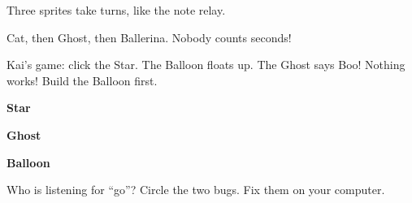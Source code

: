 \begin{exercise}
Three sprites take turns, like the note relay.
\begin{center}
\begin{scratch}[scale=0.8]
\end{scratch}
\quad
\begin{scratch}[scale=0.8]
\end{scratch}
\quad
\begin{scratch}[scale=0.8]
\end{scratch}
\end{center}
Cat, then Ghost, then Ballerina. Nobody counts seconds!
\end{exercise}

\begin{exercise}
Kai's game: click the Star. The Balloon floats up. The Ghost says Boo! Nothing works! Build the Balloon first.
\begin{center}
\begin{minipage}[t]{0.48\linewidth}\centering
\textbf{Star}\par\smallskip
\begin{scratch}[scale=0.8]
\end{scratch}

\bigskip
\textbf{Ghost}\par\smallskip
\begin{scratch}[scale=0.8]
\end{scratch}
\end{minipage}\hfill
\begin{minipage}[t]{0.48\linewidth}\centering
\textbf{Balloon}\par\smallskip
\begin{scratch}[scale=0.8]
\end{scratch}
\end{minipage}
\end{center}
Who is listening for \enquote{go}? Circle the two bugs. Fix them on your computer.
\end{exercise}


